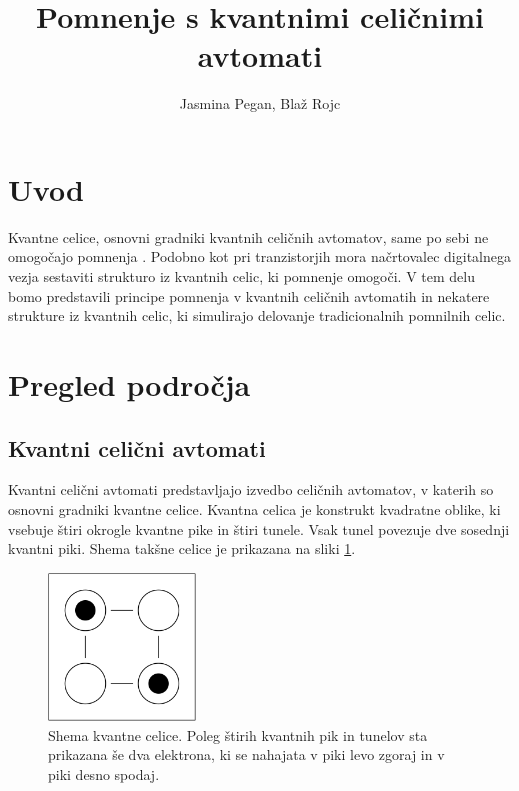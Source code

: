 \documentclass[a4paper, 11pt]{article}
\title{Pomnenje s kvantnimi celičnimi avtomati}
\author{Jasmina Pegan, Blaž Rojc}
\begin{document}
\maketitle

\renewcommand{\figurename}{Slika} %

\section{Uvod}

Kvantne celice, osnovni gradniki kvantnih celičnih avtomatov, same po sebi ne omogočajo pomnenja \cite{janez_phd}.
Podobno kot pri tranzistorjih mora načrtovalec digitalnega vezja sestaviti strukturo iz kvantnih celic, ki pomnenje omogoči.
V tem delu bomo predstavili principe pomnenja v kvantnih celičnih avtomatih in nekatere strukture iz kvantnih celic, ki simulirajo delovanje tradicionalnih pomnilnih celic.



\section{Pregled področja}

\subsection{Kvantni celični avtomati}

Kvantni celični avtomati predstavljajo izvedbo celičnih avtomatov, v katerih so osnovni gradniki kvantne celice.
Kvantna celica je konstrukt kvadratne oblike, ki vsebuje štiri okrogle kvantne pike in štiri tunele.
Vsak tunel povezuje dve sosednji kvantni piki.
Shema takšne celice je prikazana na sliki \ref{img-pregled-single-cell}.

\begin{figure}[h]
	\centering
	\includegraphics[width=0.35\textwidth]{../img/pregled/single_cell.pdf}
	\caption{Shema kvantne celice. Poleg štirih kvantnih pik in tunelov sta prikazana še dva elektrona, ki se nahajata v piki levo zgoraj in v piki desno spodaj.}
	\label{img-pregled-single-cell}
\end{figure}
\end{document}
